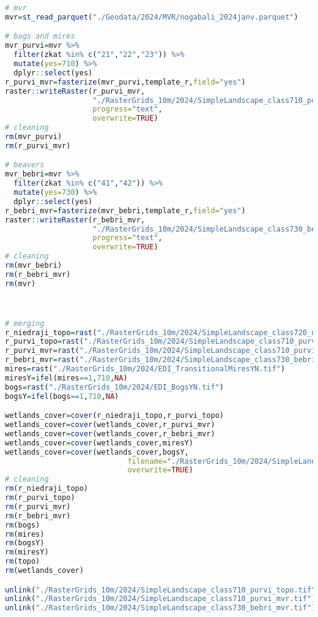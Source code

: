 \documentclass[
]{book}
\begin{document}
\begin{lstlisting}[language=R]
# mvr
mvr=st_read_parquet("./Geodata/2024/MVR/nogabali_2024janv.parquet")

# bogs and mires
mvr_purvi=mvr %>% 
  filter(zkat %in% c("21","22","23")) %>% 
  mutate(yes=710) %>% 
  dplyr::select(yes)
r_purvi_mvr=fasterize(mvr_purvi,template_r,field="yes")
raster::writeRaster(r_purvi_mvr,
                    "./RasterGrids_10m/2024/SimpleLandscape_class710_purvi_mvr.tif",
                    progress="text",
                    overwrite=TRUE)
# cleaning
rm(mvr_purvi)
rm(r_purvi_mvr)

# beavers
mvr_bebri=mvr %>% 
  filter(zkat %in% c("41","42")) %>% 
  mutate(yes=730) %>% 
  dplyr::select(yes)
r_bebri_mvr=fasterize(mvr_bebri,template_r,field="yes")
raster::writeRaster(r_bebri_mvr,
                    "./RasterGrids_10m/2024/SimpleLandscape_class730_bebri_mvr.tif",
                    progress="text",
                    overwrite=TRUE)
# cleaning
rm(mvr_bebri)
rm(r_bebri_mvr)
rm(mvr)



# merging
r_niedraji_topo=rast("./RasterGrids_10m/2024/SimpleLandscape_class720_niedraji_topo.tif")
r_purvi_topo=rast("./RasterGrids_10m/2024/SimpleLandscape_class710_purvi_topo.tif")
r_purvi_mvr=rast("./RasterGrids_10m/2024/SimpleLandscape_class710_purvi_mvr.tif")
r_bebri_mvr=rast("./RasterGrids_10m/2024/SimpleLandscape_class730_bebri_mvr.tif")
mires=rast("./RasterGrids_10m/2024/EDI_TransitionalMiresYN.tif")
miresY=ifel(mires==1,710,NA)
bogs=rast("./RasterGrids_10m/2024/EDI_BogsYN.tif")
bogsY=ifel(bogs==1,710,NA)

wetlands_cover=cover(r_niedraji_topo,r_purvi_topo)
wetlands_cover=cover(wetlands_cover,r_purvi_mvr)
wetlands_cover=cover(wetlands_cover,r_bebri_mvr)
wetlands_cover=cover(wetlands_cover,miresY)
wetlands_cover=cover(wetlands_cover,bogsY,
                            filename="./RasterGrids_10m/2024/SimpleLandscape_class700_mitraji_premask.tif",
                            overwrite=TRUE)
# cleaning
rm(r_niedraji_topo)
rm(r_purvi_topo)
rm(r_purvi_mvr)
rm(r_bebri_mvr)
rm(bogs)
rm(mires)
rm(bogsY)
rm(miresY)
rm(topo)
rm(wetlands_cover)

unlink("./RasterGrids_10m/2024/SimpleLandscape_class710_purvi_topo.tif")
unlink("./RasterGrids_10m/2024/SimpleLandscape_class710_purvi_mvr.tif")
unlink("./RasterGrids_10m/2024/SimpleLandscape_class730_bebri_mvr.tif")
\end{lstlisting}
\end{document}
